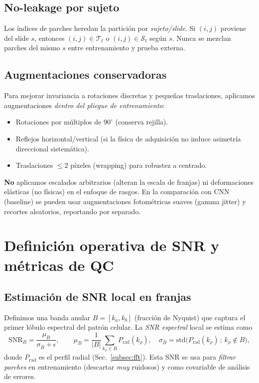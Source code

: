 \subsection{No-leakage por sujeto}
Los índices de parches heredan la partición por \emph{sujeto/slide}. Si $(i,j)$ proviene del slide $s$, entonces $(i,j)\in \mathcal{T}_t$ o $(i,j)\in \mathcal{S}_t$ según $s$. Nunca se mezclan parches del mismo $s$ entre entrenamiento y prueba externa.

\subsection{Augmentaciones conservadoras}
Para mejorar invariancia a rotaciones discretas y pequeñas traslaciones, aplicamos augmentaciones \emph{dentro del pliegue de entrenamiento}:
\begin{itemize}
\item Rotaciones por múltiplos de $90^\circ$ (conserva rejilla).
\item Reflejos horizontal/vertical (si la física de adquisición no induce asimetría direccional sistemática).
\item Traslaciones $\le 2$ píxeles (wrapping) para robustez a centrado.
\end{itemize}
\textbf{No} aplicamos escalados arbitrarios (alteran la escala de franjas) ni deformaciones elásticas (no físicas) en el enfoque de rasgos. En la comparación con CNN (baseline) se pueden usar augmentaciones fotométricas suaves (gamma jitter) y recortes aleatorios, reportando por separado.

\section{Definición operativa de SNR y métricas de QC}
\subsection{Estimación de SNR local en franjas}
Definimos una banda anular $B=[k_a,k_b]$ (fracción de Nyquist) que captura el primer lóbulo espectral del patrón celular. La \emph{SNR espectral} local se estima como
\begin{equation}
\mathrm{SNR}_B = \frac{\mu_B}{\sigma_{\bar{B}}+\epsilon},\qquad 
\mu_B=\frac{1}{|B|}\sum_{k_\rho\in B} P_{\mathrm{rad}}(k_\rho),\quad
\sigma_{\bar{B}}=\mathrm{std}\big(P_{\mathrm{rad}}(k_\rho)\,;\, k_\rho\notin B\big),
\end{equation}
donde $P_{\mathrm{rad}}$ es el perfil radial (Sec.~\ref{subsec:fft}). Esta SNR se usa para \emph{filtrar parches} en entrenamiento (descartar \emph{muy} ruidosos) y como covariable de análisis de errores.

